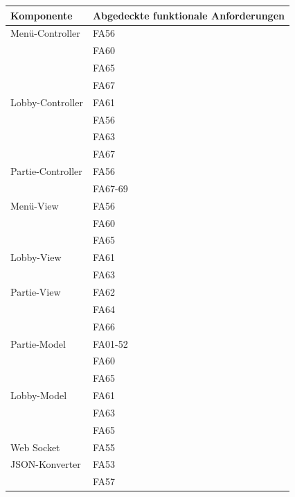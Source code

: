 	\begin{center}
		\begin{tabular}{|l|l|}
			\hline
			\textbf{Komponente} & \textbf{Abgedeckte funktionale Anforderungen}\\ \hline
			Menü-Controller & FA56 \\ 
			& FA60 \\
			& FA65 \\
			& FA67 \\ \hline
		
			Lobby-Controller & FA61 \\
			& FA56 \\
			& FA63 \\
			& FA67 \\ \hline
		
			Partie-Controller & FA56 \\
			&  FA67-69 \\
		
			Menü-View & FA56 \\ 
			& FA60 \\
			& FA65 \\ \hline
		
			Lobby-View & FA61 \\ 
			& FA63 \\ \hline
		
			Partie-View & FA62 \\ 
			& FA64 \\ 
			& FA66 \\ \hline
		
			Partie-Model & FA01-52 \\ 
			& FA60 \\
			& FA65 \\ \hline
		
			Lobby-Model & FA61 \\ 
			& FA63 \\
			& FA65 \\ \hline
		
			Web Socket & FA55 \\ \hline
		
			JSON-Konverter & FA53 \\
			& FA57\\ \hline
		\end{tabular}	
	\end{center}
	